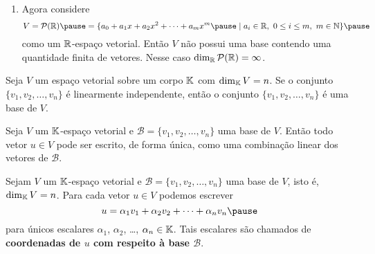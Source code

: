 \documentclass{beamer}
\begin{document}
\begin{frame}
    \begin{exemplos}
        \begin{enumerate}[label={\roman*})]
            \conti
            \item Agora considere
            \[
                V = \mathcal{P}(\real) \pause = \{a_0 + a_1x + a_2x^2 + \cdots + a_mx^m \pause \mid a_i \in \real,\ 0 \le i \le m,\ m \in \n\}\pause
            \]
            como um $\mathbb{R}$-espaço vetorial. \pause Então $V$ não possui uma base \pause contendo uma quantidade finita de vetores. \pause Nesse caso $\dim_{\mathbb{R}}\mathcal{P}(\mathbb{R}) = \infty$.
        \end{enumerate}
    \end{exemplos}
\end{frame}

\begin{frame}
  \begin{teorema}
    Seja $V$ um espaço vetorial sobre um corpo $\mathbb{K}$ \pause com $\dim_{\mathbb{K}}V = n$. \pause Se o conjunto $\{v_1, v_2, \dots, v_n\}$ \pause é linearmente independente, \pause então o conjunto $\{v_1, v_2, \dots, v_n\}$ é uma base de $V$.
  \end{teorema}
\end{frame}

\begin{frame}
  \begin{teorema}
    Seja $V$ um $\mathbb{K}$-espaço vetorial \pause e $\mathcal{B} = \{v_1, v_2, \dots, v_n\}$ uma base de $V$. \pause Então todo vetor $u \in V$ \pause pode ser escrito, de forma única, \pause como uma combinação linear dos vetores de $\mathcal{B}$.
  \end{teorema}
\end{frame}

\begin{frame}
  \begin{definicao}
    Sejam $V$ um $\mathbb{K}$-espaço vetorial \pause e $\mathcal{B} = \{v_1, v_2, \dots, v_n\}$ uma base de $V$, \pause isto é, $\dim_{\mathbb{K}}V = n$. \pause Para cada vetor $u \in V$ \pause podemos escrever
    \[
      u = \alpha_1v_1 + \alpha_2v_2 + \cdots + \alpha_nv_n\pause
    \]
    para únicos escalares \pause $\alpha_1$, $\alpha_2$, \dots, $\alpha_n \in \mathbb{K}$. \pause Tais escalares são chamados de \textbf{coordenadas de $u$ com respeito à base $\mathcal{B}$}.\pause
  \end{definicao}
\end{frame}
\end{document}
